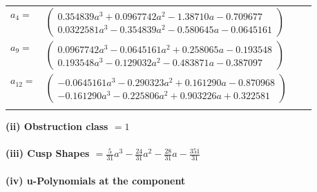 \documentclass[1p]{elsarticle_modified}
\theoremstyle{definition}
\begin{document}
\begin{tabular}{m{7pt} m{180pt} m{7pt} m{180pt} }
\flushright $a_{4}=$&$\begin{pmatrix}0.354839 a^{3}+0.0967742 a^{2}-1.38710 a-0.709677\\0.0322581 a^{3}-0.354839 a^{2}-0.580645 a-0.0645161\end{pmatrix}$ \\
\flushright $a_{9}=$&$\begin{pmatrix}0.0967742 a^{3}-0.0645161 a^{2}+0.258065 a-0.193548\\0.193548 a^{3}-0.129032 a^{2}-0.483871 a-0.387097\end{pmatrix}$ \\
\flushright $a_{12}=$&$\begin{pmatrix}-0.0645161 a^{3}-0.290323 a^{2}+0.161290 a-0.870968\\-0.161290 a^{3}-0.225806 a^{2}+0.903226 a+0.322581\end{pmatrix}$\\&\end{tabular}
\flushleft \textbf{(ii) Obstruction class $= 1$}\\~\\
\flushleft \textbf{(iii) Cusp Shapes $= \frac{5}{31} a^3-\frac{24}{31} a^2-\frac{28}{31} a-\frac{351}{31}$}\\~\\
\newpage\renewcommand{\arraystretch}{1}
\flushleft \textbf{(iv) u-Polynomials at the component}\newline \\
\end{document}
